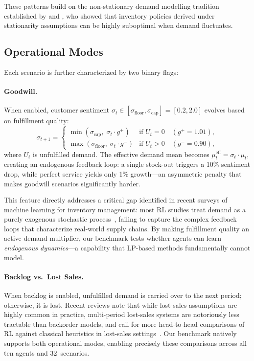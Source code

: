 \documentclass[preprint,12pt]{elsarticle}
\begin{document}
\noindent These patterns build on the non-stationary demand modelling
tradition established by \citet{graves1999nonstationary} and
\citet{song1993fluctuating}, who showed that inventory policies derived
under stationarity assumptions can be highly suboptimal when demand
fluctuates.

\subsection{Operational Modes}

Each scenario is further characterized by two binary flags:

\paragraph{Goodwill.} When enabled, customer sentiment $\sigma_t \in
[\sigma_{\text{floor}}, \sigma_{\text{cap}}] = [0.2, 2.0]$ evolves based
on fulfillment quality:
\begin{equation}\label{eq:goodwill}
  \sigma_{t+1} = \begin{cases}
    \min(\sigma_{\text{cap}},\; \sigma_t \cdot g^+) & \text{if } U_t = 0
    \quad (g^+ = 1.01), \\
    \max(\sigma_{\text{floor}},\; \sigma_t \cdot g^-) & \text{if } U_t > 0
    \quad (g^- = 0.90),
  \end{cases}
\end{equation}
where $U_t$ is unfulfilled demand. The effective demand mean becomes
$\mu_t^{\text{eff}} = \sigma_t \cdot \mu_t$, creating an endogenous
feedback loop: a single stock-out triggers a 10\% sentiment drop, while
perfect service yields only 1\% growth---an asymmetric penalty that
makes goodwill scenarios significantly harder.

This feature directly addresses a critical gap identified in recent
surveys of machine learning for inventory management: most RL studies
treat demand as a purely exogenous stochastic
process~\citep{gholami2024systematic}, failing to capture the complex
feedback loops that characterize real-world supply chains. By making
fulfillment quality an active demand multiplier, our benchmark tests
whether agents can learn \emph{endogenous dynamics}---a capability that
LP-based methods fundamentally cannot model.

\paragraph{Backlog vs.\ Lost Sales.} When backlog is enabled, unfulfilled
demand is carried over to the next period; otherwise, it is lost.
Recent reviews note that while lost-sales assumptions are highly common
in practice, multi-period lost-sales systems are notoriously less
tractable than backorder models, and call for more head-to-head
comparisons of RL against classical heuristics in lost-sales
settings~\citep{gholami2024systematic}. Our benchmark natively
supports both operational modes, enabling precisely these comparisons
across all ten agents and 32~scenarios.
\end{document}
